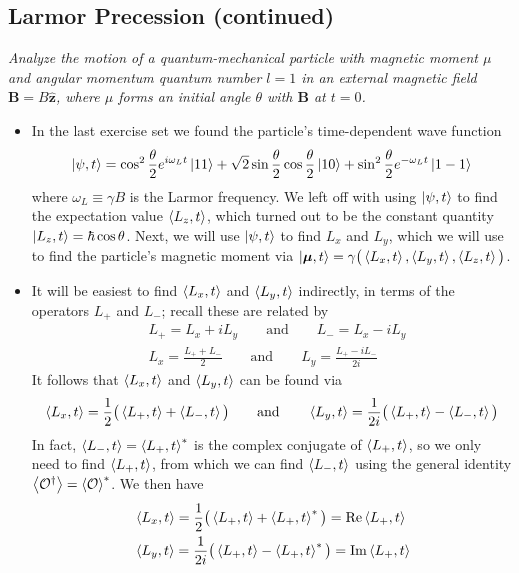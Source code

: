\documentclass[11pt, a4paper]{article}
\newcommand{\eqtext}[1]{\qquad \text{#1} \qquad}
\renewcommand{\vec}[1]{\bm{#1}} %
\newcommand{\uvec}[1]{\hat{\vec{#1}}} %
\newcommand{\m}{\vec{\mu}}  %
\begin{document}
\subsection{Larmor Precession (continued)}
\textit{Analyze the motion of a quantum-mechanical particle with magnetic moment $ \mu $ and angular momentum quantum number $ l = 1 $ in an external magnetic field $ \vec{B} = B\uvec{z} $, where $ \mu $ forms an initial angle $ \theta $ with $ \vec{B} $ at $ t = 0 $.}
\begin{itemize}
	\item In the last exercise set we found the particle's time-dependent wave function
	\begin{equation*}
		\ket{\psi, t} =\cos^{2} \frac{\theta}{2} e^{i \omega_{L} t}\ket{11} + \sqrt{2}\sin \frac{\theta}{2} \cos \frac{\theta}{2} \ket{10} + \sin^{2}\frac{\theta}{2} e^{-\omega_{L} t}\ket{1 -1}
	\end{equation*}
	where $ \omega_{L} \equiv \gamma B $ is the Larmor frequency. We left off with using $ \ket{\psi, t} $ to find the expectation value $ \ev{L_{z}, t} $, which turned out to be the constant quantity $ \ket{L_{z}, t} = \hbar \cos \theta $. Next, we will use $ \ket{\psi, t} $ to find $ L_{x} $ and $ L_{y} $, which we will use to find the particle's magnetic moment via $ \ket{\m, t} = \gamma \big(\ev{L_{x}, t}, \ev{L_{y}, t}, \ev{L_{z}, t}\big) $.
	
	\item It will be easiest to find $ \ev{L_{x}, t} $ and $ \ev{L_{y}, t} $ indirectly, in terms of the operators $ L_{+} $ and $ L_{-} $; recall these are related by 
	\begin{align*}
		& L_{+} = L_{x} + iL_{y} \eqtext{and} L_{-} = L_{x} - i L_{y}\\
		& L_{x} = \frac{L_{+}+L_{-}}{2} \eqtext{and} L_{y} = \frac{L_{+} - iL_{-}}{2i}
	\end{align*}
	It  follows that  $ \ev{L_{x}, t} $ and $ \ev{L_{y}, t} $ can be found via
	\begin{equation*}
		\ev{L_{x}, t} = \frac{1}{2}\big(\ev{L_{+}, t} + \ev{L_{-}, t} \big) \eqtext{and} \ev{L_{y}, t} = \frac{1}{2i}\big(\ev{L_{+}, t} - \ev{L_{-}, t} \big)
	\end{equation*}
	In fact, $ \ev{L_{-}, t} = \ev{L_{+}, t}^{*} $ is the complex conjugate of  $ \ev{L_{+}, t} $, so we only need to find $ \ev{L_{+}, t} $, from which we can find $ \ev{L_{-}, t} $ using the general identity $ \ev{\mathcal{O}^{\dagger}} = \ev{\mathcal{O}}^{*} $. We then have
	\begin{align*}
		& \ev{L_{x}, t} = \frac{1}{2}\big(\ev{L_{+}, t} + \ev{L_{+}, t}^{*} \big) = \Re \ev{L_{+}, t}\\
		& \ev{L_{y}, t} = \frac{1}{2i}\big(\ev{L_{+}, t} - \ev{L_{+}, t}^{*} \big) = \Im \ev{L_{+}, t}
	\end{align*}
	

\end{itemize}
\end{document}
